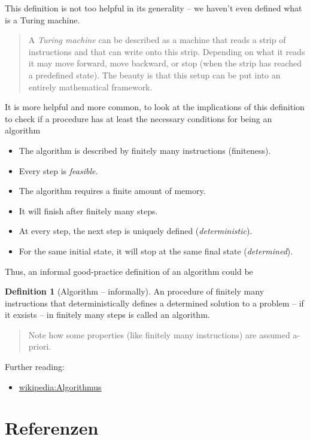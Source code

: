 \documentclass[
]{book}
\providecommand{\tightlist}{%
  \setlength{\itemsep}{0pt}\setlength{\parskip}{0pt}}
\newenvironment {JHSAYS} [0] {\begin{quote}\color{jhsc}} {\end{quote}}
\theoremstyle{definition}
\newtheorem{definition}{Definition}[chapter]
\theoremstyle{definition}
\theoremstyle{definition}
\theoremstyle{definition}
\theoremstyle{remark}
\begin{document}
This definition is not too helpful in its generality -- we haven't even defined what is a Turing machine.

\leavevmode\hypertarget{rem-coors}{}%
\begin{JHSAYS}
A \emph{Turing machine} can be described as a machine that reads a strip of instructions and that can write onto this strip. Depending on what it reads it may move forward, move backward, or stop (when the strip has reached a predefined state). The beauty is that this setup can be put into an entirely mathematical framework.

\end{JHSAYS}

It is more helpful and more common, to look at the implications of this definition to check if a procedure has at least the necessary conditions for being an algorithm

\begin{itemize}
\tightlist
\item
  The algorithm is described by finitely many instructions (finiteness).
\item
  Every step is \emph{feasible}.
\item
  The algorithm requires a finite amount of memory.
\item
  It will finish after finitely many steps.
\item
  At every step, the next step is uniquely defined (\emph{deterministic}).
\item
  For the same initial state, it will stop at the same final state (\emph{determined}).
\end{itemize}

Thus, an informal good-practice definition of an algorithm could be

\begin{definition}[Algorithm -- informally]
\protect\hypertarget{def:info-algorithm}{}\label{def:info-algorithm}An procedure of finitely many instructions that deterministically defines a determined solution to a problem -- if it exsists -- in finitely many steps is called an algorithm.
\end{definition}

\leavevmode\hypertarget{rem-coors}{}%
\begin{JHSAYS}
Note how some properties (like finitely many instructions) are assumed a-priori.

\end{JHSAYS}

Further reading:

\begin{itemize}
\tightlist
\item
  \href{https://de.wikipedia.org/wiki/Algorithmus\#Definition}{wikipedia:Algorithmus}
\end{itemize}

\hypertarget{referenzen}{%
\chapter*{Referenzen}\label{referenzen}}
\end{document}
